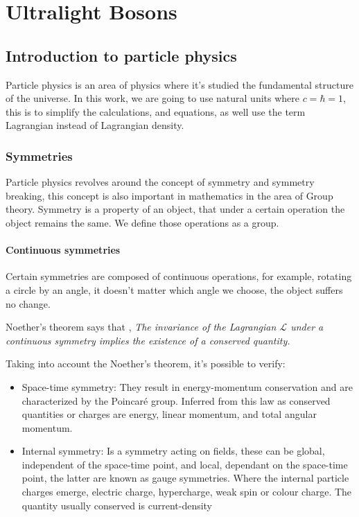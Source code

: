 \chapter{Ultralight Bosons}
\label{chapter:Ultralight Bosons}

\section{Introduction to particle physics}

Particle physics is an area of physics where it's studied the fundamental structure of the universe.  In this work, we are going to use natural units where $c=\hbar=1$, this is to simplify the calculations, and equations, as well use the term Lagrangian instead of Lagrangian density.

\subsection{Symmetries}
Particle physics revolves around the concept of symmetry and symmetry breaking, this concept is also important in mathematics in the area of Group theory.
Symmetry is a property of an object, that under a certain operation the object remains the same. We define those operations as a group.

\subsubsection{Continuous symmetries}
Certain symmetries are composed of continuous operations, for example, rotating a circle by an angle, it doesn't matter which angle we choose, the object suffers no change.

Noether's theorem says that \cite{Noether1918},
\textit{The invariance of the Lagrangian $\mathcal{L}$ under a continuous symmetry implies the existence of a conserved quantity.}

Taking into account the Noether's theorem, it's possible to verify:
\begin{itemize}
	\item Space-time symmetry:
	They result in energy-momentum conservation and are characterized by the Poincaré group. Inferred from this law as conserved quantities or charges are energy, linear momentum, and total angular momentum. 
	\item Internal symmetry:
	Is a symmetry acting on fields, these can be global, independent of the space-time point, and local, dependant on the space-time point, the latter  are known as gauge symmetries. Where the internal particle charges emerge, electric charge, hypercharge, weak spin or colour charge.
	The quantity usually conserved is current-density
\end{itemize}


